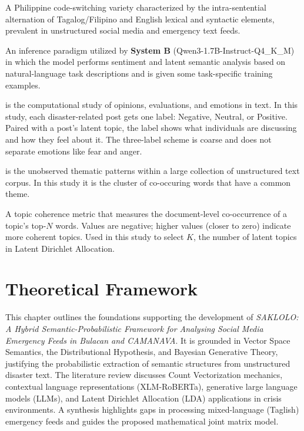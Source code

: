 \documentclass[12pt,a4paper]{report}
\newcommand{\sysB}{\textbf{System B}}
\newcommand{\xlmr}{XLM-RoBERTa}
\begin{document}
\begin{description}[style=sameline,leftmargin=0pt]
  \item[Taglish.] A Philippine code-switching variety characterized by the
  intra-sentential alternation of Tagalog/Filipino and English lexical and
  syntactic elements, prevalent in unstructured social media and emergency
  text feeds.

  \item[Few-Shot Prompting.] An inference paradigm utilized by \sysB{}
  (Qwen3-1.7B-Instruct-Q4\_K\_M) in which the model performs sentiment and latent semantic analysis
  based on natural-language task descriptions and is given some task-specific
  training examples.
  
  \item[Sentiment Analysis.]  is the computational study of opinions,
   evaluations, and emotions in text. In this study, each disaster-related 
   post gets one label: Negative, Neutral, or Positive. Paired with a post’s
   latent topic, the label shows what individuals are discussing and how 
   they feel about it. The three-label scheme is coarse and does not 
   separate emotions like fear and anger.
   
   \item[latent topics / latent topic structures.]  is the unobserved thematic
   patterns within a large collection of unstructured text corpus. In this study
   it is the cluster of co-occuring words that have a common theme.
  

  \item[UMass Coherence.] A topic coherence metric that measures the
  document-level co-occurrence of a topic's top-$N$ words. Values are negative;
  higher values (closer to zero) indicate more coherent topics. Used in this
  study to select $K$, the number of latent topics in Latent Dirichlet
  Allocation.
  
\end{description}

\chapter{Theoretical Framework}

This chapter outlines the foundations supporting the development of
\emph{SAKLOLO: A Hybrid Semantic-Probabilistic Framework for Analysing Social
Media Emergency Feeds in Bulacan and CAMANAVA}. It is grounded in Vector Space
Semantics, the Distributional Hypothesis, and Bayesian Generative Theory,
justifying the probabilistic extraction of semantic structures from
unstructured disaster text. The literature review discusses Count
Vectorization mechanics, contextual language representations (\xlmr),
generative large language models (LLMs), and Latent Dirichlet Allocation (LDA)
applications in crisis environments. A synthesis highlights gaps in processing
mixed-language (Taglish) emergency feeds and guides the proposed mathematical
joint matrix model.
\end{document}
